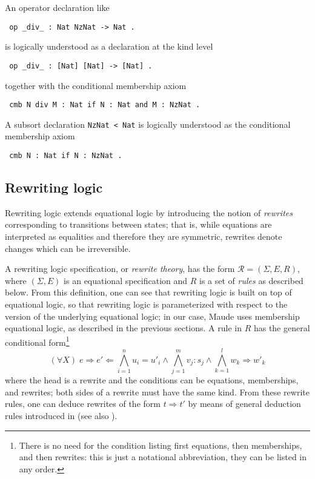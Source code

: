 An operator declaration like

{\codesize
\begin{verbatim}
 op _div_ : Nat NzNat -> Nat .
\end{verbatim}
}

\noindent
is logically understood as a declaration at the kind level

{\codesize
\begin{verbatim}
 op _div_ : [Nat] [Nat] -> [Nat] .
\end{verbatim}
}

\noindent
together with the conditional membership axiom

{\codesize
\begin{verbatim}
 cmb N div M : Nat if N : Nat and M : NzNat .
\end{verbatim}
}

A subsort declaration \texttt{NzNat < Nat} is logically understood as
the conditional membership axiom

{\codesize
\begin{verbatim}
 cmb N : Nat if N : NzNat .
\end{verbatim}
}

\subsection{Rewriting logic}

Rewriting logic extends equational logic by introducing the notion of \emph{rewrites} 
corresponding to
transitions between states; that is, while equations are interpreted as equalities and therefore
they are symmetric, rewrites denote changes which can be irreversible. 

A rewriting logic specification, or \emph{rewrite theory}, has the form
$\mathcal{R} = (\Sigma,E,R)$, where $(\Sigma,E)$ is an equational specification
and $R$ is a set of \emph{rules} as described below. From this definition, one can see that
rewriting logic is built on top of equational logic, so that rewriting logic is parameterized
with respect to the version of the underlying equational logic; in our case, Maude uses 
membership equational logic, as described in the previous sections.
A rule in $R$ has the general conditional form\footnote{There is no need for the condition listing first equations, then 
memberships, and then rewrites: this is just a notational abbreviation,
they can be listed in any order.} 
\[
(\forall X) \; e \Rightarrow e' \Leftarrow \bigwedge_{i=1}^{n} u_i = u'_i \wedge
                      \bigwedge_{j=1}^{m}  v_j : s_j \wedge
                      \bigwedge_{k=1}^{l} w_k \Rightarrow w'_k
\]
where the head is a rewrite and the conditions can be equations, memberships, and
rewrites; both sides of a rewrite must have the same kind. 
From these rewrite rules, one can deduce rewrites of the form $t \Rightarrow t'$ by
means of general deduction rules introduced in \cite{Meseguer92-tcs} (see also \cite{BruniMeseguer06}).

